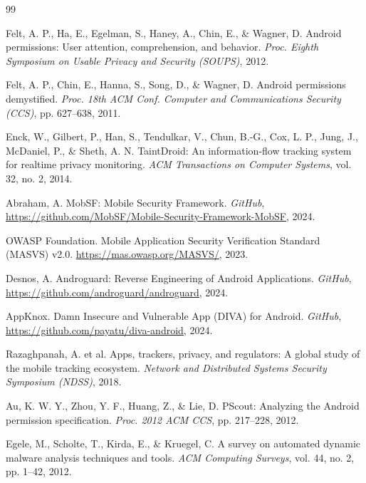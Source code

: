 \documentclass[3p,times]{elsarticle}
\begin{document}
\begin{thebibliography}{99}

Felt, A. P., Ha, E., Egelman, S., Haney, A., Chin, E., \& Wagner, D.
Android permissions: User attention, comprehension, and behavior.
\textit{Proc. Eighth Symposium on Usable Privacy and Security (SOUPS)}, 2012.

Felt, A. P., Chin, E., Hanna, S., Song, D., \& Wagner, D.
Android permissions demystified.
\textit{Proc. 18th ACM Conf. Computer and Communications Security (CCS)},
pp. 627--638, 2011.

Enck, W., Gilbert, P., Han, S., Tendulkar, V., Chun, B.-G., Cox, L. P.,
Jung, J., McDaniel, P., \& Sheth, A. N.
TaintDroid: An information-flow tracking system for realtime privacy monitoring.
\textit{ACM Transactions on Computer Systems}, vol. 32, no. 2, 2014.

Abraham, A. MobSF: Mobile Security Framework.
\textit{GitHub}, \url{https://github.com/MobSF/Mobile-Security-Framework-MobSF}, 2024.

OWASP Foundation. Mobile Application Security Verification Standard
(MASVS) v2.0. \url{https://mas.owasp.org/MASVS/}, 2023.

Desnos, A. Androguard: Reverse Engineering of Android Applications.
\textit{GitHub}, \url{https://github.com/androguard/androguard}, 2024.

AppKnox. Damn Insecure and Vulnerable App (DIVA) for Android.
\textit{GitHub}, \url{https://github.com/payatu/diva-android}, 2024.

Razaghpanah, A. et al.
Apps, trackers, privacy, and regulators: A global study of the mobile
tracking ecosystem.
\textit{Network and Distributed Systems Security Symposium (NDSS)}, 2018.

Au, K. W. Y., Zhou, Y. F., Huang, Z., \& Lie, D.
PScout: Analyzing the Android permission specification.
\textit{Proc. 2012 ACM CCS}, pp. 217--228, 2012.

Egele, M., Scholte, T., Kirda, E., \& Kruegel, C.
A survey on automated dynamic malware analysis techniques and tools.
\textit{ACM Computing Surveys}, vol. 44, no. 2, pp. 1--42, 2012.

\end{thebibliography}
\end{document}
